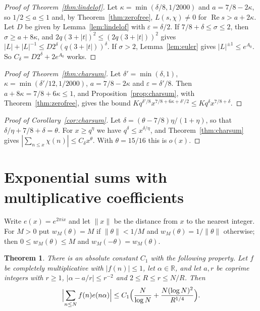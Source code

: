 \documentclass[12pt]{amsart}
\newtheorem{theorem}{Theorem}[section]
\theoremstyle{remark}
\renewcommand{\Re}{\operatorname{Re}}
\newcommand{\R}{\mathbb{R}}
\begin{document}
\begin{proof}[Proof of Theorem~\ref{thm:lindelof}]
Let $\kappa=\min(\delta/8,1/2000)$ and $a=7/8-2\kappa$, so $1/2\le a\le1$ and, by
Theorem~\ref{thm:zerofree}, $L(s,\chi)\ne0$ for $\Re s>a+2\kappa$. Let $D$ be given by
Lemma~\ref{lem:lindelof} with $\varepsilon=\delta/2$. If $7/8+\delta\le\sigma\le2$, then
$\sigma\ge a+8\kappa$, and $2q(3+|t|)^2\le(2q(3+|t|))^2$ gives
$|L|+|L|^{-1}\le D2^\delta(q(3+|t|))^\delta$. If $\sigma>2$, Lemma~\ref{lem:euler} gives
$|L|^{\pm1}\le e^{A_0}$. So $C_\delta=D2^\delta+2e^{A_0}$ works.
\end{proof}

\begin{proof}[Proof of Theorem~\ref{thm:charsum}]
Let $\delta'=\min(\delta,1)$, $\kappa=\min(\delta'/12,1/2000)$, $a=7/8-2\kappa$ and
$\varepsilon=\delta'/8$. Then $a+8\kappa=7/8+6\kappa\le1$, and Proposition~\ref{prop:charsum},
with Theorem~\ref{thm:zerofree}, gives the bound
$Kq^{\delta'/8}x^{7/8+6\kappa+\delta'/2}\le Kq^\delta x^{7/8+\delta}$.
\end{proof}

\begin{proof}[Proof of Corollary~\ref{cor:charsum}]
Let $\delta=(\theta-7/8)\eta/(1+\eta)$, so that $\delta/\eta+7/8+\delta=\theta$. For
$x\ge q^\eta$ we have $q^\delta\le x^{\delta/\eta}$, and Theorem~\ref{thm:charsum} gives
$|\sum_{n\le x}\chi(n)|\le C_\delta x^\theta$. With $\theta=15/16$ this is $o(x)$.
\end{proof}


\section{Exponential sums with multiplicative coefficients}\label{sec:mv}

Write $e(x)=e^{2\pi ix}$ and let $\|x\|$ be the distance from $x$ to the nearest integer. For
$M>0$ put $w_M(\theta)=M$ if $\|\theta\|<1/M$ and $w_M(\theta)=1/\|\theta\|$ otherwise; then
$0\le w_M(\theta)\le M$ and $w_M(-\theta)=w_M(\theta)$.

\begin{theorem}\label{thm:mv}
There is an absolute constant $C_1$ with the following property. Let $f$ be completely
multiplicative with $|f(n)|\le1$, let $\alpha\in\R$, and let $a,r$ be coprime integers with $r\ge1$,
$|\alpha-a/r|\le r^{-2}$ and $2\le R\le r\le N/R$. Then
\[
  \Bigl|\sum_{n\le N}f(n)e(n\alpha)\Bigr|\le C_1\Bigl(\frac N{\log N}
  +\frac{N(\log N)^2}{R^{1/4}}\Bigr).
\]
\end{theorem}
\end{document}
